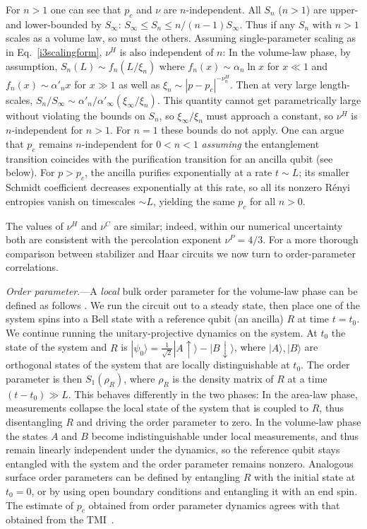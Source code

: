 \documentclass[prl,twocolumn,aps,showpacs,amsmath,amssymb,superscriptaddress,floatfix,longbibliography]{revtex4-1}
\begin{document}
For $n > 1$ one can see that $p_c$ and $\nu$ are $n$-independent. All $S_n$ ($n > 1$) are upper- and lower-bounded by $S_\infty$: $S_\infty \leq S_n \leq n/(n-1) S_\infty$. Thus if any $S_n$ with $n > 1$ scales as a volume law, so must the others. Assuming single-parameter scaling as in Eq.~\eqref{i3scalingform}, $\nu^H$ is also independent of $n$: In the volume-law phase, by assumption, $S_n(L) \sim f_n(L/\xi_n)$ where $f_n(x) \sim \alpha_n \ln x$ for $x \ll 1$ and $f_n(x) \sim \alpha'_n x$ for $x \gg 1$ as well as $\xi_n \sim |p-p_c|^{-\nu_n^H}$. Then at very large length-scales, $S_n/S_\infty \sim \alpha'_n/\alpha'_\infty (\xi_\infty/\xi_n)$. This quantity cannot get parametrically large without violating the bounds on $S_n$, so $\xi_\infty/\xi_n$ must approach a constant, so $\nu^H$ is $n$-independent for $n > 1$.   For $n = 1$ these bounds do not apply. 
One can argue that $p_c$ remains $n$-independent for $0 < n < 1$ \emph{assuming} the entanglement transition coincides with the purification transition for an ancilla qubit (see below). For $p > p_c$, the ancilla purifies exponentially at a rate $t \sim L$; its smaller Schmidt coefficient decreases exponentially at this rate, so all its nonzero R\'enyi entropies vanish on timescales $\sim L$, yielding the same $p_c$ for all $n > 0$. 







The values of $\nu^H$ and $\nu^C$ are similar; indeed, within our numerical uncertainty both are consistent with the percolation exponent $\nu^P=4/3$.  For a more thorough comparison between stabilizer and Haar circuits we now turn to order-parameter correlations.

\emph{Order parameter}.---A \emph{local} bulk order parameter for the volume-law phase can be defined as follows \cite{Gullans2019b}. We run the circuit out to a steady state, then place one of the system spins into a Bell state with a reference qubit (an ancilla) $R$ at time $t = t_0$. We continue running the unitary-projective dynamics on the system. At $t_0$ the state of the system and $R$ is $|\psi_0\rangle = \frac{1}{\sqrt{2}} |A \uparrow\rangle - |B \downarrow \rangle$, where $|A\rangle, |B\rangle$ are orthogonal states of the system that are locally distinguishable at $t_0$. The order parameter is then $S_1(\rho_R)$, where $\rho_R$ is the density matrix of $R$ at a time $(t-t_0)\gg L$. This behaves differently in the two phases: In the area-law phase, measurements collapse the local state of the system that is coupled to $R$, thus disentangling $R$ and driving the order parameter to zero. In the volume-law phase the states $A$ and $B$ become indistinguishable under local measurements, and thus remain linearly independent under the dynamics, so the reference qubit stays entangled with the system and the order parameter remains nonzero.   Analogous surface order parameters can be defined by entangling $R$ with the initial state at $t_0=0$, or by using open boundary conditions and entangling it with an end spin.  The estimate of $p_c$ obtained from order parameter dynamics agrees with that obtained from the TMI~\cite{suppmat}.
\end{document}
